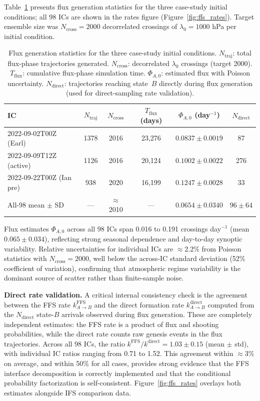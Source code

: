 \documentclass[11pt]{article}
\begin{document}
Table~\ref{tab:flux_results} presents flux generation statistics for the three case-study initial conditions; all 98 ICs are shown in the rates figure (Figure~\ref{fig:ffs_rates}). Target ensemble size was $N_{\text{cross}} = 2000$ decorrelated crossings of $\lambda_0 = 1000$ hPa per initial condition.

\begin{table}[htbp]
\centering
\caption{Flux generation statistics for the three case-study initial conditions. $N_{\text{traj}}$: total flux-phase trajectories generated. $N_{\text{cross}}$: decorrelated $\lambda_0$ crossings (target 2000). $T_{\text{flux}}$: cumulative flux-phase simulation time. $\Phi_{A,0}$: estimated flux with Poisson uncertainty. $N_{\text{direct}}$: trajectories reaching state~$B$ directly during flux generation (used for direct-sampling rate validation).}
\label{tab:flux_results}
\begin{tabular}{lccccc}
\toprule
IC & $N_{\text{traj}}$ & $N_{\text{cross}}$ & $T_{\text{flux}}$ (days) & $\Phi_{A,0}$ (day$^{-1}$) & $N_{\text{direct}}$ \\
\midrule
2022-09-02T00Z (Earl)    & 1378 & 2016 & 23{,}276 & $0.0837 \pm 0.0019$ &  87 \\
2022-09-09T12Z (active)  & 1126 & 2016 & 20{,}124 & $0.1002 \pm 0.0022$ & 276 \\
2022-09-22T00Z (Ian pre) &  938 & 2020 & 16{,}199 & $0.1247 \pm 0.0028$ &  33 \\
\midrule
All-98 mean $\pm$ SD & --- & $\approx$2010 & --- & $0.0654 \pm 0.0340$ & $96 \pm 64$ \\
\bottomrule
\end{tabular}
\end{table}

Flux estimates $\Phi_{A,0}$ across all 98 ICs span 0.016 to 0.191 crossings day$^{-1}$ (mean $0.065 \pm 0.034$), reflecting strong seasonal dependence and day-to-day synoptic variability. Relative uncertainties for individual ICs are $\approx$2.2\% from Poisson statistics with $N_{\text{cross}} = 2000$, well below the across-IC standard deviation (52\% coefficient of variation), confirming that atmospheric regime variability is the dominant source of scatter rather than finite-sample noise.

\textbf{Direct rate validation.} A critical internal consistency check is the agreement between the FFS rate $k_{A\to B}^{\text{FFS}}$ and the direct formation rate $k_{A\to B}^{\text{direct}}$ computed from the $N_{\text{direct}}$ state-$B$ arrivals observed during flux generation. These are completely independent estimates: the FFS rate is a product of flux and shooting probabilities, while the direct rate counts raw genesis events in the flux trajectories. Across all 98 ICs, the ratio $k^{\text{FFS}}/k^{\text{direct}} = 1.03 \pm 0.15$ (mean $\pm$ std), with individual IC ratios ranging from 0.71 to 1.52. This agreement within $\approx$3\% on average, and within 50\% for all cases, provides strong evidence that the FFS interface decomposition is correctly implemented and that the conditional probability factorization is self-consistent. Figure~\ref{fig:ffs_rates} overlays both estimates alongside IFS comparison data.
\end{document}

